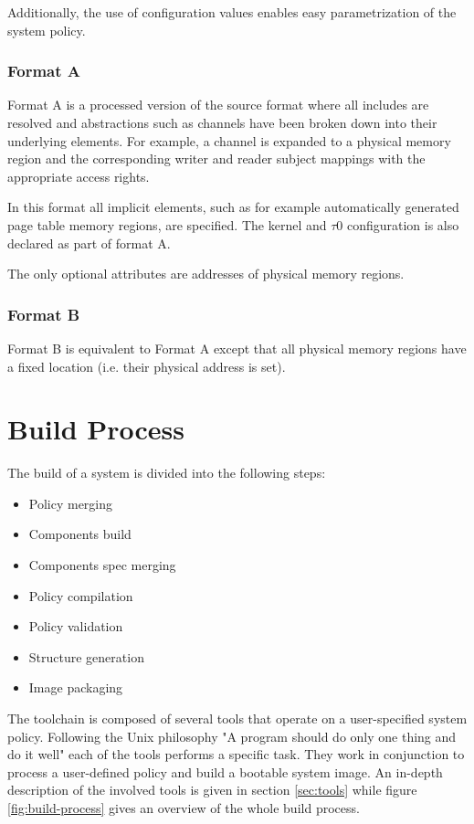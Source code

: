 \documentclass[a4paper,twoside,titlepage]{article}
\begin{document}
Additionally, the use of configuration values enables easy parametrization of
the system policy.

\subsubsection{Format A}
Format A is a processed version of the source format where all includes are
resolved and abstractions such as channels have been broken down into their
underlying elements. For example, a channel is expanded to a physical memory
region and the corresponding writer and reader subject mappings with the
appropriate access rights.

In this format all implicit elements, such as for example automatically
generated page table memory regions, are specified. The kernel and $\tau$0
configuration is also declared as part of format A.

The only optional attributes are addresses of physical memory regions.

\subsubsection{Format B}
Format B is equivalent to Format A except that all physical memory regions have
a fixed location (i.e. their physical address is set).

\section{Build Process}
The build of a system is divided into the following steps:

\begin{itemize}
	\item Policy merging
	\item Components build
	\item Components spec merging
	\item Policy compilation
	\item Policy validation
	\item Structure generation
	\item Image packaging
\end{itemize}

The toolchain is composed of several tools that operate on a user-specified
system policy. Following the Unix philosophy "A program should do only one thing
and do it well" each of the tools performs a specific task. They work in
conjunction to process a user-defined policy and build a bootable system image.
An in-depth description of the involved tools is given in section
\ref{sec:tools} while figure \ref{fig:build-process} gives an overview of the
whole build process.
\end{document}
